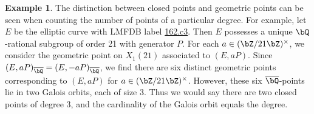 \documentclass[11pt,reqno]{amsart}
\theoremstyle{plain}
\theoremstyle{definition}
\newtheorem{example}[theorem]{Example}
\newcommand{\Q}{\bQ}
\newcommand{\Z}{\bZ}
\begin{document}
\begin{example}
The distinction between closed points and geometric points can be seen when counting the number of points of a particular degree. For example, let $E$ be the elliptic curve with LMFDB label \href{https://www.lmfdb.org/EllipticCurve/Q/162/c/3}{162.c3}. Then $E$ possesses a unique $\Q$-rational subgroup of order 21 with generator $P$. For each $a \in (\Z/21\Z)^{\times}$, we consider the geometric point on $X_1(21)$ associated to $(E,aP)$. Since $(E,aP)_{\overline{\Q}}=(E,-aP)_{\overline{\Q}}$, we find there are six distinct geometric points corresponding to $(E,aP)$ for $a \in (\Z/21\Z)^{\times}$. However, these six $\overline{\Q}$-points lie in two Galois orbits, each of size 3. Thus we would say there are two closed points of degree 3, and the cardinality of the Galois orbit equals the degree.
\end{example}

\end{document}
